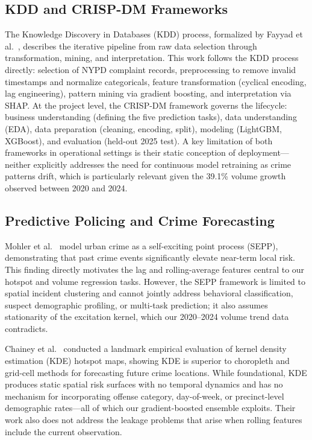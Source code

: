 \documentclass[conference]{IEEEtran}
\begin{document}
\subsection{KDD and CRISP-DM Frameworks}
The Knowledge Discovery in Databases (KDD) process, formalized by Fayyad et al.\ \cite{fayyad1996}, describes the iterative pipeline from raw data selection through transformation, mining, and interpretation. This work follows the KDD process directly: selection of NYPD complaint records, preprocessing to remove invalid timestamps and normalize categoricals, feature transformation (cyclical encoding, lag engineering), pattern mining via gradient boosting, and interpretation via SHAP. At the project level, the CRISP-DM framework \cite{chapman2000} governs the lifecycle: business understanding (defining the five prediction tasks), data understanding (EDA), data preparation (cleaning, encoding, split), modeling (LightGBM, XGBoost), and evaluation (held-out 2025 test). A key limitation of both frameworks in operational settings is their static conception of deployment—neither explicitly addresses the need for continuous model retraining as crime patterns drift, which is particularly relevant given the 39.1\% volume growth observed between 2020 and 2024.

\subsection{Predictive Policing and Crime Forecasting}
Mohler et al.\ \cite{mohler2011} model urban crime as a self-exciting point process (SEPP), demonstrating that past crime events significantly elevate near-term local risk. This finding directly motivates the lag and rolling-average features central to our hotspot and volume regression tasks. However, the SEPP framework is limited to spatial incident clustering and cannot jointly address behavioral classification, suspect demographic profiling, or multi-task prediction; it also assumes stationarity of the excitation kernel, which our 2020--2024 volume trend data contradicts.

Chainey et al.\ \cite{chainey2008} conducted a landmark empirical evaluation of kernel density estimation (KDE) hotspot maps, showing KDE is superior to choropleth and grid-cell methods for forecasting future crime locations. While foundational, KDE produces static spatial risk surfaces with no temporal dynamics and has no mechanism for incorporating offense category, day-of-week, or precinct-level demographic rates—all of which our gradient-boosted ensemble exploits. Their work also does not address the leakage problems that arise when rolling features include the current observation.
\end{document}
